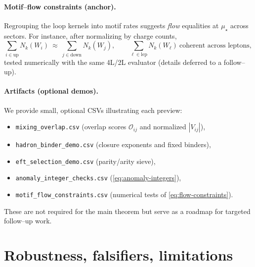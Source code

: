 \documentclass[epjc3]{svjour3}
\begin{document}
\paragraph{Motif--flow constraints (anchor).}
Regrouping the loop kernels into motif rates suggests \emph{flow} equalities at $\mu_\star$ across sectors. For instance, after normalizing by charge counts,
\begin{equation}
  \sum_{i\in \text{up}} N_k(W_i)\ \approx\ \sum_{j\in \text{down}} N_k(W_j),
  \qquad
  \sum_{\ell\in \text{lep}} N_k(W_\ell)\ \text{coherent across leptons},
  \label{eq:flow-constraints}
\end{equation}
tested numerically with the same 4L/2L evaluator (details deferred to a follow--up).

\paragraph{Artifacts (optional demos).}
We provide small, optional CSVs illustrating each preview:
\begin{itemize}
  \item \texttt{mixing\_overlap.csv} (overlap scores $\mathcal O_{ij}$ and normalized $|V_{ij}|$),
  \item \texttt{hadron\_binder\_demo.csv} (closure exponents and fixed binders),
  \item \texttt{eft\_selection\_demo.csv} (parity/arity sieve),
  \item \texttt{anomaly\_integer\_checks.csv} (\eqref{eq:anomaly-integers}),
  \item \texttt{motif\_flow\_constraints.csv} (numerical tests of \eqref{eq:flow-constraints}).
\end{itemize}
These are not required for the main theorem but serve as a roadmap for targeted follow--up work.

\section{Robustness, falsifiers, limitations}
\end{document}
